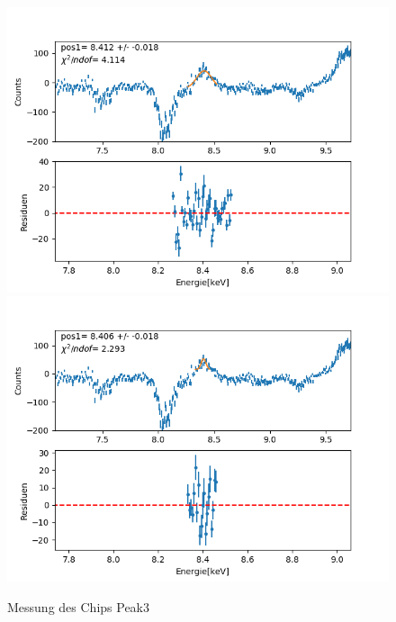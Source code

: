 \documentclass[12pt,a4paper]{article}
\begin{document}
\begin{figure}[H]
\centering
\includegraphics[scale=0.49]{Bilder/roentgen_spektren/chip/chip3_1.png}
\includegraphics[scale=0.49]{Bilder/roentgen_spektren/chip/chip3_2.png}
\caption{Messung des Chips Peak3}
\end{figure}
\end{document}
